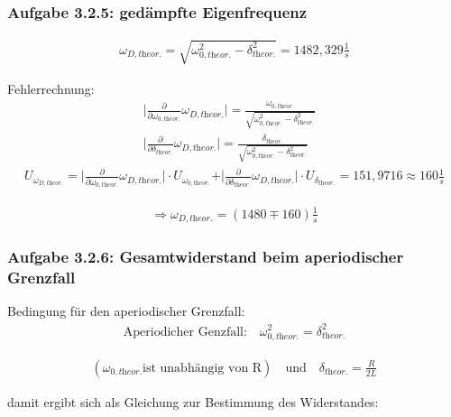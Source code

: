 \documentclass[a4paper]{scrartcl}
\numberwithin{equation}{subsection}
\begin{document}
\subsubsection{Aufgabe 3.2.5: gedämpfte Eigenfrequenz}

\begin{align}
\omega_{D,\textit{theor.}} = \sqrt{\omega_{0,\textit{theor.}}^2 - \delta_{\textit{theor.}}^2} = 1482,329 \frac{1}{s}
\end{align}

Fehlerrechnung:
\begin{align*}
\vert \frac{\partial}{\partial \omega_{0,\textit{theor.}}}\omega_{D,\textit{theor.}}\vert = \frac{\omega_{0,\textit{theor.}}}{\sqrt{\omega_{0,\textit{theor.}}^2 - \delta_{\textit{theor.}}^2}} &\\
\vert \frac{\partial}{\partial \delta_{\textit{theor.}}}\omega_{D,\textit{theor.}}\vert = \frac{\delta_{\textit{theor.}}}{\sqrt{\omega_{0,\textit{theor.}}^2 - \delta_{\textit{theor.}}^2}} &
\end{align*}
\begin{align*}
U_{\omega_{D,\textit{theor.}}} = \vert \frac{\partial}{\partial \omega_{0,\textit{theor.}}}\omega_{D,\textit{theor.}}\vert \cdot U_{\omega_{0,\textit{theor.}}} + \vert \frac{\partial}{\partial \delta_{\textit{theor.}}}\omega_{D,\textit{theor.}}\vert \cdot U_{\delta_{\textit{theor.}}} = 151,9716 \approx 160 \frac{1}{s}
\end{align*}

\begin{align*}
\Rightarrow \omega_{D,\textit{theor.}} = (1480 \mp 160) \frac{1}{s}
\end{align*}

\subsubsection{Aufgabe 3.2.6: Gesamtwiderstand beim aperiodischer Grenzfall}

Bedingung für den aperiodischer Grenzfall:
\begin{align}
\text{Aperiodicher Genzfall:} \quad \omega_{0,\textit{theor.}}^2 = \delta_{\textit{theor.}}^2
\end{align}

\begin{align*}
(\omega_{0,\textit{theor.}} \text{ist unabhängig von R}) \quad \text{und} \quad
\delta_{\textit{theor.}} = \frac{R}{2L}
\end{align*}

damit ergibt sich als Gleichung zur Bestimmung des Widerstandes:
\end{document}

